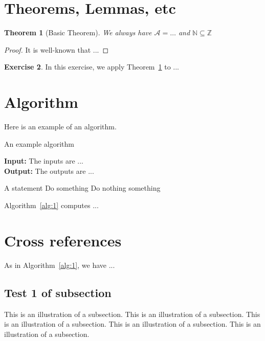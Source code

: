 \documentclass[a4paper]{article}
\newtheorem{theorem}{Theorem}[section]
\theoremstyle{definition}
\newtheorem{exercise}[theorem]{Exercise}
\theoremstyle{remark}
\numberwithin{equation}{section}
\begin{document}
\section{Theorems, Lemmas, etc}

\begin{theorem}[Basic Theorem]\label{thrm:1}
We always have $\mathcal{A} = \dots$ and $\mathbb{N} \subseteq \mathbb{Z}$
\end{theorem}

\begin{proof}
It is well-known that ...
\end{proof}

\begin{exercise}
In this exercise, we apply Theorem~\ref{thrm:1} to ...
\end{exercise}

\section{Algorithm}

Here is an example of an algorithm.

\begin{algorithm}[!ht]
\caption{An example algorithm}
\label{alg:1}
\begin{flushleft}
\textbf{Input:} The inputs are ...\\
\textbf{Output:} The outputs are ...
\end{flushleft}
\begin{algorithmic}[1]
\State A statement
	\State Do something
\Else
	\State Do nothing
\EndIf
\State \Return something
\end{algorithmic}
\end{algorithm}

Algorithm~\ref{alg:1} computes ...

\section{Cross references}

As in Algorithm~\ref{alg:1}, we have ...

\subsection{Test 1 of subsection}

This is an illustration of a subsection.
This is an illustration of a subsection.
This is an illustration of a subsection.
This is an illustration of a subsection.
This is an illustration of a subsection.
\end{document}
